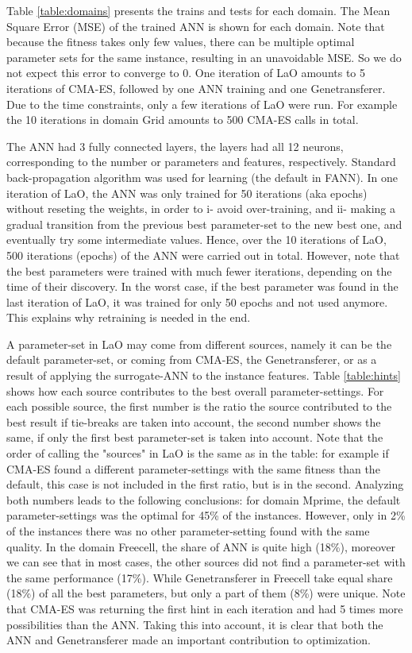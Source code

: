 \documentclass[runningheads,a4paper]{llncs}
\begin{document}
Table \ref{table:domains} presents the trains and tests for each domain. The Mean Square Error (MSE) of the trained ANN is shown for each domain. Note that because the fitness takes only few values, there can be multiple optimal parameter sets for the same instance, resulting in an unavoidable MSE. So we do not expect this error to converge to 0. One iteration of LaO amounts to 5 iterations of CMA-ES, followed by one ANN training and one Genetransferer. Due to the time constraints, only a few iterations of LaO were run. For example the 10 iterations in domain Grid amounts to 500 CMA-ES calls in total.

The ANN had 3 fully connected layers, the layers had all 12 neurons, corresponding to the number or parameters and features, respectively. Standard back-propagation algorithm was used for learning (the default in FANN). In one iteration of LaO, the ANN was only trained for 50 iterations (aka epochs) without reseting the weights, in order to i- avoid over-training, and ii- making a gradual transition from the previous best parameter-set to the new best one, and eventually try some intermediate values. Hence, over the 10 iterations of LaO, 500 iterations (epochs) of the ANN were carried out in total. However, note that the best parameters were trained with much fewer iterations, depending on the time of their discovery. In the worst case, if the best parameter was found in the last iteration of LaO, it was trained for only 50 epochs and not used anymore. This explains why retraining is needed in the end.

A parameter-set in LaO may come from different sources, namely it can be the default parameter-set, or coming from CMA-ES, the Genetransferer, or as a result of applying the surrogate-ANN to the instance features. Table \ref{table:hints} shows how each source contributes to the best overall parameter-settings. For each possible source, the first number is the ratio the source contributed to the best result if tie-breaks are taken into account, the second number shows the same, if only the first best parameter-set is taken into account. Note that the order of calling the "sources" in LaO is the same as in the table: for example if CMA-ES found a different parameter-settings with the same fitness than the default, this case is not included in the first ratio, but is in the second. Analyzing both numbers leads to the following conclusions: for domain Mprime, the default parameter-settings was the optimal for 45\% of the instances. However, only in 2\% of the instances there was no other parameter-setting found with the same quality. In the domain Freecell, the share of ANN is quite high (18\%), moreover we can see that in most cases, the other sources did not find a parameter-set with the same performance (17\%). While Genetransferer in Freecell take equal share (18\%) of all the best parameters, but only a part of them (8\%) were unique. Note that CMA-ES was returning the first hint in each iteration and had 5 times more possibilities than the ANN. Taking this into account, it is clear that both the ANN and Genetransferer made an important contribution to optimization.
\end{document}
